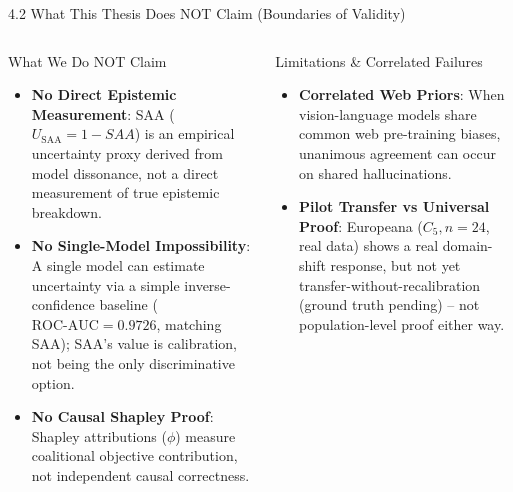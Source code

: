 \documentclass[aspectratio=169,11pt]{beamer}
\begin{document}
\begin{frame}{4.2 What This Thesis Does NOT Claim (Boundaries of Validity)}
\begin{columns}[T]
\begin{alertblock}{What We Do NOT Claim}
\begin{itemize}
  \scriptsize
  \item \textbf{No Direct Epistemic Measurement}: SAA ($U_{\text{SAA}} = 1 - SAA$) is an empirical uncertainty proxy derived from model dissonance, not a direct measurement of true epistemic breakdown.
  \item \textbf{No Single-Model Impossibility}: A single model can estimate uncertainty via a simple inverse-confidence baseline ($\text{ROC-AUC}=0.9726$, matching SAA); SAA's value is calibration, not being the only discriminative option.
  \item \textbf{No Causal Shapley Proof}: Shapley attributions ($\phi$) measure coalitional objective contribution, not independent causal correctness.
\end{itemize}
\end{alertblock}

\begin{block}{Limitations \& Correlated Failures}
\begin{itemize}
  \scriptsize
  \item \textbf{Correlated Web Priors}: When vision-language models share common web pre-training biases, unanimous agreement can occur on shared hallucinations.
  \item \textbf{Pilot Transfer vs Universal Proof}: Europeana ($C_5, n=24$, real data) shows a real domain-shift response, but not yet transfer-without-recalibration (ground truth pending) -- not population-level proof either way.
\end{itemize}
\end{block}
\end{columns}
\end{frame}
\end{document}
